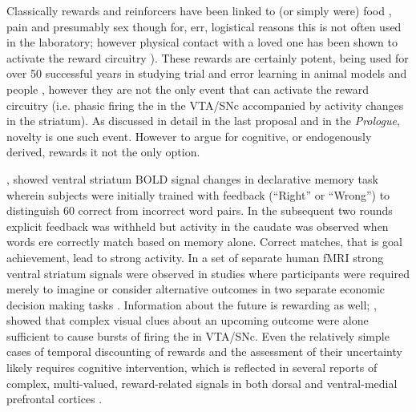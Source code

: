 \documentclass[doc,12pt]{apa}        %
\begin{document}
Classically rewards and reinforcers have been linked to (or simply were) food \cite{ODoherty:2006p2875}, pain \cite{Becerra:2011p7581,schultz:2007aa} and presumably sex though for, err, logistical reasons this is not often used in the laboratory; however physical contact with a loved one has been shown to activate the reward circuitry \cite{Izuma:2008p2822,Fliessbach:2007gf}).  These rewards are certainly potent, being used for over 50 successful years in studying trial and error learning in animal models \cite{iversen:2007aa} and people \cite{Kim:2010p7248,Montague:2006mz}, however they are not the only event that can activate the reward circuitry (i.e. phasic firing the in the VTA/SNc accompanied by activity changes in the striatum).  As discussed in detail in the last proposal and in the \emph{Prologue}, novelty is one such event.  However to argue for cognitive, or endogenously derived, rewards it not the only option.  

, showed ventral striatum BOLD signal changes in declarative memory task wherein subjects were initially trained with feedback (``Right'' or ``Wrong'') to distinguish 60 correct from incorrect word pairs.  In the subsequent two rounds explicit feedback was withheld but activity in the caudate was observed when words ere correctly match based on memory alone.  Correct matches, that is goal achievement, lead to strong activity.  In a set of separate human fMRI strong ventral striatum signals were observed in studies where participants were required merely to imagine or consider alternative outcomes in two separate economic decision making tasks \cite{Hayden:2009p6545,Lohrenz:2007p7240}.  Information about the future is rewarding as well; , showed that complex visual clues about an upcoming outcome were alone sufficient to cause bursts of firing the in VTA/SNc.  Even the relatively simple cases of temporal discounting of rewards and the assessment of their uncertainty likely requires cognitive intervention, which is reflected in several reports of complex, multi-valued, reward-related signals in both dorsal and ventral-medial prefrontal cortices \cite{Tobler:2009p8302,Wallis:2010p8303,Kim:2009p8304,Seymour:2008p6518}.
\end{document}
